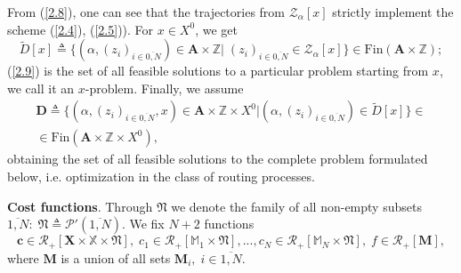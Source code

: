 From (\ref{2.8}),
one can see
that the trajectories from
$ \mathcal {Z}_\alpha[x] $
strictly implement the scheme
 (\ref{2.4}), (\ref{2.5})).
For $x \in X^0$,
we get
\begin{equation}\label{2.9}
  \tilde{D}[x] {\triangleq}
  \{(\alpha,(z_i)_{i \in \overline{0,N}}) \in \mathbf{A} \times \mathbb{Z}
  \vert \;(z_i)_{i \in \overline{0,N}} \in \mathcal{Z}_\alpha[x]\}
  \in \mathrm{Fin}(\mathbf{A} \times \mathbb{Z});
\end{equation}
 (\ref{2.9})
is the set of all feasible solutions
to a particular problem starting from $x$,
we call it an $x$-problem.
Finally, we assume
\begin{multline}\label{2.10}
  \mathbf{D} {\triangleq}
  \{(\alpha,(z_i)_{i \in \overline{0,N}},x) \in \mathbf{A} \times \mathbb{Z} \times X^0 \vert
  (\alpha,(z_i)_{i \in \overline{0,N}}) \in \tilde{D}[x]\}
  \in
  \\
  \in \mathrm{Fin}(\mathbf{A} \times \mathbb{Z} \times X^0),
\end{multline}
obtaining the set of all
feasible solutions to the complete problem formulated below,
i.e. optimization in the class of routing processes.

{\bf Cost functions}.
Through $\mathfrak{N}$
we denote the family of all non-empty subsets
$\overline{1,N}:\;\mathfrak{N} {\triangleq}  \mathcal{P}'(\overline{1,N})$.
We fix $ N + 2 $ functions
\begin{equation}\label{2.11}
  \mathbf{c} \in \mathcal{R}_+[\mathbf{X} \times \mathbb{X} \times \mathfrak{N}],\;
  c_1 \in \mathcal{R}_+[\mathbb{M}_1 \times \mathfrak{N}],...,
  c_N \in \mathcal{R}_+[\mathbb{M}_N \times \mathfrak{N}],\;
  f \in \mathcal{R}_+[\mathbf{M}],
\end{equation}
where $\mathbf{M}$
is a union of all sets
$\mathbf{M}_i,\;i \in \overline{1,N}$.

